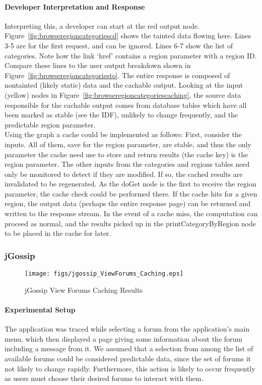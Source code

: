 \documentclass[msc,oneside]{ubcthesis}
\begin{document}
\paragraph{Developer Interpretation and Response}
Interpreting this, a developer can start at the red output node. Figure~\ref{fig:browseregioncategoriescd} shows the tainted data flowing here. Lines 3-5 are for the first request, and can be ignored. Lines 6-7 show the list of categories. Note how the link `href' contains a region parameter with a region ID. Compare these lines to the user output breakdown shown in Figure~\ref{fig:browseregioncategoriesto}. The entire response is composed of nontainted (likely static) data and the cachable output. Looking at the input (yellow) nodes in Figure~\ref{fig:browseregioncategoriescaching}, the source data responsible for the cachable output comes from database tables which have all been marked as stable (see the IDF), unlikely to change frequently, and the predictable region parameter. \\

Using the graph a cache could be implemented as follows: First, consider the inputs. All of them, save for the region parameter, are stable, and thus the only parameter the cache need use to store and return results (the cache key) is the region parameter. The other inputs from the categories and regions tables need only be monitored to detect if they are modified. If so, the cached results are invalidated to be regenerated. As the doGet node is the first to receive the region parameter, the cache check could be performed there. If the cache hits for a given region, the output data (perhaps the entire response page) can be returned and written to the response stream. In the event of a cache miss, the computation can proceed as normal, and the results picked up in the printCategoryByRegion node to be placed in the cache for later.

\subsubsection{jGossip} 

\begin{sidewaysfigure}
\centering
\scalebox{0.44}
{\texttt{[image: figs/jgossip\_ViewForums\_Caching.eps]}}
\caption{jGossip View Forums Caching Results} 
\label{fig:viewforumscaching}
\end{sidewaysfigure}

\paragraph{Experimental Setup}
\label{jgossip:caching}
The application was traced while selecting a forum from the application's main menu, which then displayed a page giving some information about the forum including a message from it. We assumed that a selection from among the list of available forums could be considered predictable data, since the set of forums it not likely to change rapidly. Furthermore, this action is likely to occur frequently as users must choose their desired forums to interact with them.
\end{document}
